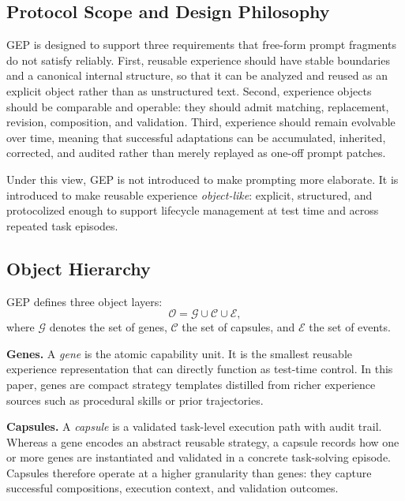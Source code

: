 \documentclass{article}
\newcommand{\nbf}[1]{{\noindent \textbf{#1}}}
\begin{document}
\subsection{Protocol Scope and Design Philosophy}
\label{app:gep_scope}

GEP is designed to support three requirements that free-form prompt fragments do not satisfy reliably. 
First, reusable experience should have stable boundaries and a canonical internal structure, so that it can be analyzed and reused as an explicit object rather than as unstructured text. 
Second, experience objects should be comparable and operable: they should admit matching, replacement, revision, composition, and validation. 
Third, experience should remain evolvable over time, meaning that successful adaptations can be accumulated, inherited, corrected, and audited rather than merely replayed as one-off prompt patches.

Under this view, GEP is not introduced to make prompting more elaborate. 
It is introduced to make reusable experience \emph{object-like}: explicit, structured, and protocolized enough to support lifecycle management at test time and across repeated task episodes.

\subsection{Object Hierarchy}
\label{app:gep_objects}

GEP defines three object layers:
\begin{equation}
\mathcal{O} = \mathcal{G} \cup \mathcal{C} \cup \mathcal{E},
\end{equation}
where $\mathcal{G}$ denotes the set of genes, $\mathcal{C}$ the set of capsules, and $\mathcal{E}$ the set of events.

\nbf{Genes.}
A \emph{gene} is the atomic capability unit. 
It is the smallest reusable experience representation that can directly function as test-time control. 
In this paper, genes are compact strategy templates distilled from richer experience sources such as procedural skills or prior trajectories.

\nbf{Capsules.}
A \emph{capsule} is a validated task-level execution path with audit trail. 
Whereas a gene encodes an abstract reusable strategy, a capsule records how one or more genes are instantiated and validated in a concrete task-solving episode. 
Capsules therefore operate at a higher granularity than genes: they capture successful compositions, execution context, and validation outcomes.
\end{document}
